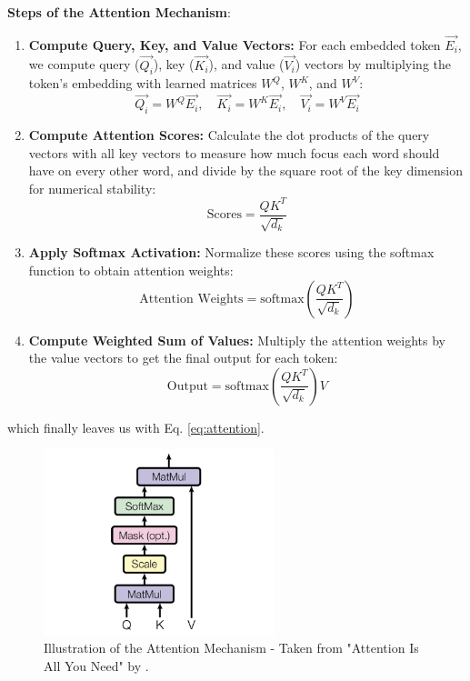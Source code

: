                 \textbf{Steps of the Attention Mechanism}:
                \begin{enumerate}
                    \item \textbf{Compute Query, Key, and Value Vectors:} For each embedded token \(\overrightarrow{E_i}\), we compute query (\(\overrightarrow{Q_i}\)), key (\(\overrightarrow{K_i}\)), and value (\(\overrightarrow{V_i}\)) vectors by multiplying the token's embedding with learned matrices \(W^Q\), \(W^K\), and \(W^V\):
                    \[
                    \overrightarrow{Q_i} = W^Q\overrightarrow{E_i}, \quad \overrightarrow{K_i} = W^K\overrightarrow{E_i}, \quad \overrightarrow{V_i} = W^V\overrightarrow{E_i}
                    \]

                    \item \textbf{Compute Attention Scores:} Calculate the dot products of the query vectors with all key vectors to measure how much focus each word should have on every other word, and divide by the square root of the key dimension for numerical stability:
                    \[
                    \text{Scores} = \frac{QK^T}{\sqrt{d_k}}
                    \]

                    \item \textbf{Apply Softmax Activation:} Normalize these scores using the softmax function to obtain attention weights:
                    \[
                    \text{Attention Weights} = \text{softmax}\left(\frac{QK^T}{\sqrt{d_k}}\right)
                    \]

                    \item \textbf{Compute Weighted Sum of Values:} Multiply the attention weights by the value vectors to get the final output for each token:
                    \[
                    \text{Output} = \text{softmax}\left(\frac{QK^T}{\sqrt{d_k}}\right) V
                    \]
                \end{enumerate}
                which finally leaves us with Eq. \ref{eq:attention}.
                \begin{figure}[H]
                    \centering
                    \includegraphics[width=0.6\textwidth]{figs/Scaled_dot_product.png}
                    \caption{Illustration of the Attention Mechanism - Taken from "Attention Is All You Need" by \cite{vaswani2023attention}.}
                    \label{fig:attention_mechanism}
                \end{figure}

